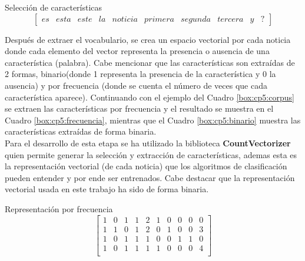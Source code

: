 \begin{mygraybox}[label={box:cp5:caracteristicas}]{Selección de características} 
\begin{equation*}
\begin{bmatrix}
es & esta & este & la & noticia & primera & segunda & tercera & y & ?
\end{bmatrix}
\end{equation*}
\end{mygraybox}




Después de extraer el  vocabulario, se crea un espacio vectorial por cada noticia donde cada elemento del vector representa la presencia o ausencia de una característica (palabra). Cabe mencionar que las características son extraídas de 2 formas, binario(donde 1 representa la presencia de la característica y 0 la ausencia) y por frecuencia (donde se cuenta el número de veces que cada característica aparece). Continuando con el ejemplo del Cuadro \ref{box:cp5:corpus} se extraen las características por frecuencia y el resultado se muestra en el Cuadro \ref{box:cp5:frecuencia}, mientras que el Cuadro \ref{box:cp5:binario} muestra las características extraídas de forma binaria.\\

Para el desarrollo de esta etapa se ha utilizado la biblioteca \textbf{CountVectorizer} quien permite generar la selección y extracción de características, ademas esta es la representación vectorial (de cada noticia) que los algoritmos de clasificación pueden entender y por ende ser entrenados. Cabe destacar que la representación vectorial usada en este trabajo ha sido de forma binaria.\\

\begin{mygraybox}[label={box:cp5:frecuencia}]{Representación por frecuencia} 
\begin{equation*}
\begin{bmatrix}
1 & 0 & 1 & 1 & 2 & 1 & 0 & 0 & 0 & 0\\
1 & 1 & 0 & 1 & 2 & 0 & 1 & 0 & 0 & 3\\
1 & 0 & 1 & 1 & 1 & 0 & 0 & 1 & 1 & 0\\
1 & 0 & 1 & 1 & 1 & 1 & 0 & 0 & 0 & 4\\
\end{bmatrix}
\end{equation*}
\end{mygraybox}

